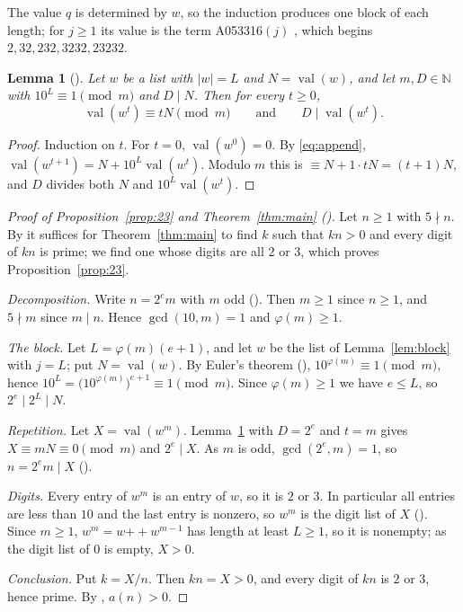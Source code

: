 \documentclass[11pt]{amsart}
\theoremstyle{plain}
\newtheorem{lemma}[theorem]{Lemma}
\theoremstyle{definition}
\newcommand{\val}{\operatorname{val}}
\begin{document}
The value $q$ is determined by $w$, so the induction produces one block of each length; for $j\ge1$ its value is the term A053316$(j)$ \cite{A053316}, which begins $2, 32, 232, 3232, 23232$.

\begin{lemma}[]\label{lem:rep}
Let $w$ be a list with $|w|=L$ and $N=\val(w)$, and let $m,D\in\mathbb N$ with $10^L\equiv1\pmod m$ and $D\mid N$. Then for every $t\ge0$,
\[
  \val(w^{t})\equiv tN\pmod m\qquad\text{and}\qquad D\mid\val(w^{t}).
\]
\end{lemma}

\begin{proof}
Induction on $t$. For $t=0$, $\val(w^0)=0$. By \eqref{eq:append}, $\val(w^{t+1})=N+10^L\val(w^{t})$. Modulo $m$ this is $\equiv N+1\cdot tN=(t+1)N$, and $D$ divides both $N$ and $10^L\val(w^{t})$.
\end{proof}

\begin{proof}[Proof of Proposition~\ref{prop:23} and Theorem~\ref{thm:main} ()]
Let $n\ge1$ with $5\nmid n$. By  it suffices for Theorem~\ref{thm:main} to find $k$ such that $kn>0$ and every digit of $kn$ is prime; we find one whose digits are all $2$ or $3$, which proves Proposition~\ref{prop:23}.

\emph{Decomposition.} Write $n=2^em$ with $m$ odd (). Then $m\ge1$ since $n\ge1$, and $5\nmid m$ since $m\mid n$. Hence $\gcd(10,m)=1$ and $\varphi(m)\ge1$.

\emph{The block.} Let $L=\varphi(m)(e+1)$, and let $w$ be the list of Lemma~\ref{lem:block} with $j=L$; put $N=\val(w)$. By Euler's theorem (), $10^{\varphi(m)}\equiv1\pmod m$, hence $10^L=\bigl(10^{\varphi(m)}\bigr)^{e+1}\equiv1\pmod m$. Since $\varphi(m)\ge1$ we have $e\le L$, so $2^e\mid2^L\mid N$.

\emph{Repetition.} Let $X=\val(w^{m})$. Lemma~\ref{lem:rep} with $D=2^e$ and $t=m$ gives $X\equiv mN\equiv0\pmod m$ and $2^e\mid X$. As $m$ is odd, $\gcd(2^e,m)=1$, so $n=2^em\mid X$ ().

\emph{Digits.} Every entry of $w^{m}$ is an entry of $w$, so it is $2$ or $3$. In particular all entries are less than $10$ and the last entry is nonzero, so $w^{m}$ is the digit list of $X$ (). Since $m\ge1$, $w^m=w\mathbin{+\!\!+}w^{m-1}$ has length at least $L\ge1$, so it is nonempty; as the digit list of $0$ is empty, $X>0$.

\emph{Conclusion.} Put $k=X/n$. Then $kn=X>0$, and every digit of $kn$ is $2$ or $3$, hence prime. By , $a(n)>0$.
\end{proof}
\end{document}
